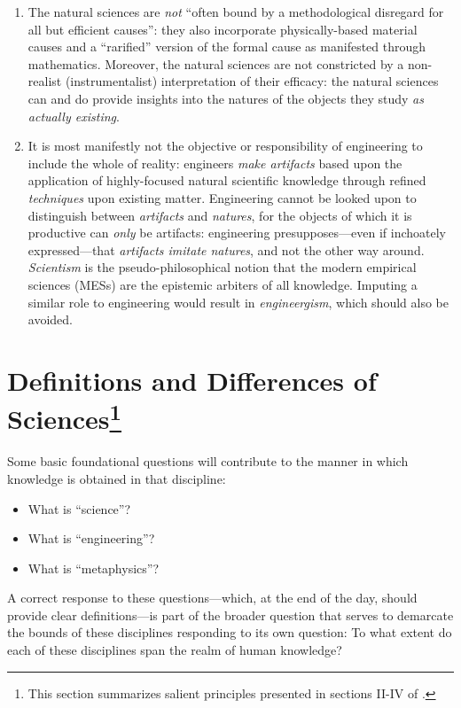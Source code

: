 \begin{enumerate}
\item The natural sciences are \textit{not} ``often bound by a methodological disregard for all but efficient causes'': they also incorporate physically-based material causes and a ``rarified'' version of the formal cause as manifested through mathematics. Moreover, the natural sciences are not constricted by a non-realist (instrumentalist) interpretation of their efficacy: the natural sciences can and do provide insights into the natures of the objects they study \textit{as actually existing}.
\item It is most manifestly not the objective or responsibility of engineering to include the whole of reality: engineers \textit{make artifacts} based upon the application of highly-focused natural scientific knowledge through refined \textit{techniques} upon existing matter. Engineering cannot be looked upon to distinguish between \textit{artifacts} and \textit{natures}, for the objects of which it is productive can \textit{only} be artifacts: engineering presupposes---even if inchoately expressed---that \textit{artifacts imitate natures}, and not the other way around. \textit{Scientism} is the pseudo-philosophical notion that the modern empirical sciences (MESs) are the epistemic arbiters of all knowledge. Imputing a similar role to engineering would result in \textit{engineergism}, which should also be avoided.
\end{enumerate}

\section[Definitions and Differences of Sciences]{Definitions and Differences of Sciences\footnote{This section summarizes salient principles presented in sections II-IV of \citet[][pgs. 23--167]{adler1978}.}}

Some basic foundational questions will contribute to the manner in which knowledge is obtained in that discipline:

\begin{itemize}
\item What is ``science''?
\item What is ``engineering''?
\item What is ``metaphysics''?
\end{itemize}

A correct response to these questions---which, at the end of the day, should provide clear definitions---is part of the broader question that serves to demarcate the bounds of these disciplines responding to its own question: To what extent do each of these disciplines span the realm of human knowledge?

